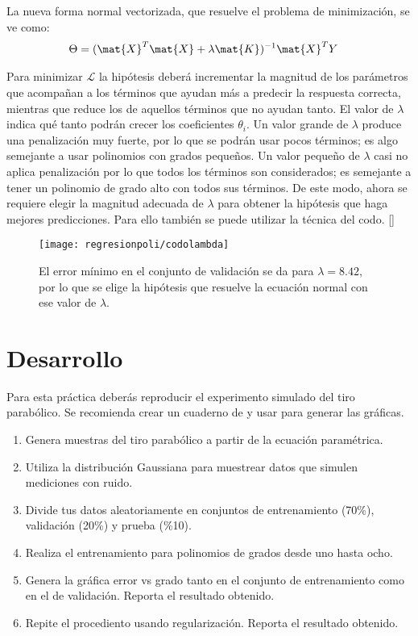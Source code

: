 La nueva forma normal vectorizada, que resuelve el problema de minimización, se ve como:
\begin{align}
 \Theta &= (\mat{X}^T \mat{X} + \lambda \mat{K})^{-1}\mat{X}^T Y
\end{align}

Para minimizar $\mathcal{L}$ la hipótesis deberá incrementar la magnitud de los parámetros que acompañan a los términos que ayudan más a predecir la respuesta correcta, mientras que reduce los de aquellos términos que no ayudan tanto.  El valor de $\lambda$ indica qué tanto podrán crecer los coeficientes $\theta_i$.  Un valor grande de $\lambda$ produce una penalización muy fuerte, por lo que se podrán usar pocos términos; es algo semejante a usar polinomios con grados pequeños.  Un valor pequeño de $\lambda$ casi no aplica penalización por lo que todos los términos son considerados; es semejante a tener un polinomio de grado alto con todos sus términos.  De este modo, ahora se requiere elegir la magnitud adecuada de $\lambda$ para obtener la hipótesis que haga mejores predicciones.  Para ello también se puede utilizar la técnica del codo. []

\begin{figure}
 \centering
 \texttt{[image: regresionpoli/codolambda]}
 \caption{El error mínimo en el conjunto de validación se da para $\lambda=8.42$, por lo que se elige la hipótesis que resuelve la ecuación normal con ese valor de $\lambda$.}\label{fig:codolambda}
\end{figure}




\section{Desarrollo}

Para esta práctica deberás reproducir el experimento simulado del tiro parabólico.  Se recomienda crear un cuaderno de \Python y usar  para generar las gráficas.

\begin{enumerate}
 \item Genera muestras del tiro parabólico a partir de la ecuación paramétrica.
 \item Utiliza la distribución Gaussiana para muestrear datos que simulen mediciones con ruido.
 \item Divide tus datos aleatoriamente en conjuntos de entrenamiento (70\%), validación (20\%) y prueba (\%10).
 \item Realiza el entrenamiento para polinomios de grados desde uno hasta ocho.
 \item Genera la gráfica error vs grado tanto en el conjunto de entrenamiento como en el de validación. Reporta el resultado obtenido.
 \item Repite el procediento usando regularización. Reporta el resultado obtenido.
\end{enumerate}
